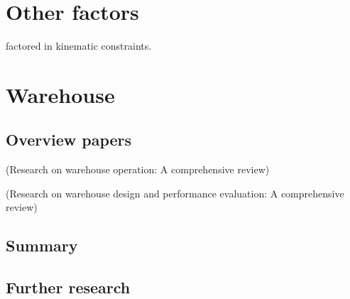 \documentclass[a4paper,11pt]{article}
\begin{document}
\section{Other factors}
\cite{honig2016multi} factored in kinematic constraints.

\section{Warehouse}

\subsection{Overview papers}
\cite{gu2007research} (Research on warehouse operation: A comprehensive review)

\cite{gu2010research} (Research on warehouse design and performance evaluation: A comprehensive review)

\subsection{Summary}


\subsection{Further research}




\end{document}
